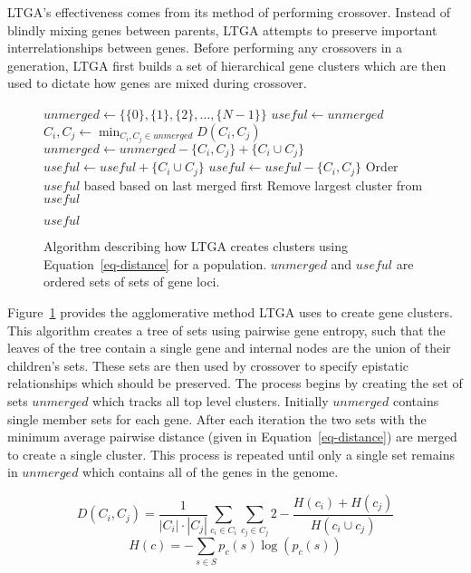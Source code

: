 \documentclass[twoside]{article}
\begin{document}
LTGA's effectiveness comes from its method of performing crossover. Instead of blindly
mixing genes between parents, LTGA attempts to preserve important interrelationships
between genes. Before performing any crossovers in a generation, LTGA first builds
a set of hierarchical gene clusters which are then used to dictate how genes are mixed
during crossover.

\begin{figure}
  \begin{algorithmic}[1]
    \State $unmerged \leftarrow \{\{0\}, \{1\}, \{2\}, \dots, \{N-1\}\}$
    \State $useful \leftarrow unmerged$
      \State $C_i, C_j \leftarrow \min_{C_i,C_j \in unmerged} D(C_i, C_j)$
      \State $unmerged \leftarrow unmerged - \{C_i, C_j\} + \{C_i \cup C_j\}$
      \State $useful \leftarrow useful + \{C_i \cup C_j\}$
        \State $useful \leftarrow useful - \{C_i, C_j\}$
      \EndIf
    \EndWhile
    \State Order $useful$ based based on last merged first\label{fig-cluster-creation-ordering}
    \State Remove largest cluster from $useful$

    \Return $useful$
  \EndProcedure
\end{algorithmic}
  \caption{Algorithm describing how LTGA creates clusters using Equation~\ref{eq-distance}
           for a population. $unmerged$ and $useful$ are ordered sets of sets of gene loci.}
  \label{fig-cluster-creation}
\end{figure}

Figure~\ref{fig-cluster-creation} provides the agglomerative method LTGA uses to create gene clusters.
This algorithm creates a tree of sets using pairwise gene entropy, such that the leaves of the tree contain a single gene and
internal nodes are the union of their children's sets. These sets are then used by crossover to specify epistatic
relationships which should be preserved.
The process begins by creating the set of sets $unmerged$ which tracks all top level clusters. Initially
$unmerged$ contains single member sets for each gene. After each iteration the two sets with the minimum average pairwise
distance (given in Equation~\ref{eq-distance}) are merged to create a single cluster. This process is repeated
until only a single set remains in $unmerged$ which contains all of the genes in the genome.

\begin{equation}
  D(C_i,C_j) = \frac{1}{\left | C_i \right |\cdot \left |C_j \right|}\sum_{c_i \in C_i}\sum_{c_j \in C_j}
  2 - \frac{H(c_i) + H(c_j)}{H(c_i \cup c_j)}
  \label{eq-distance}
\end{equation}
\begin{equation}
  H(c) = -\sum_{s\in S} p_c(s)\log(p_c(s))
  \label{eq-entropy}
\end{equation}
\end{document}
